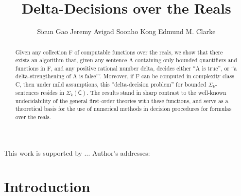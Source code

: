\documentclass[prodmode]{acmsmall} %
\title{Delta-Decisions over the Reals}
\author{Sicun Gao\affil{Carnegie Mellon University} Jeremy Avigad\affil{Carnegie Mellon University}  Soonho Kong\affil{Carnegie Mellon University} Edmund M. Clarke\affil{Carnegie Mellon University}}
\begin{document}
\begin{abstract}
Given any collection F of computable functions over the reals, we show that there exists an algorithm that, given any sentence A containing only bounded quantifiers and functions in F, and any positive rational number delta, decides either ``A is true'', or ``a delta-strengthening of A is false'''. Moreover, if F can be computed in complexity class C, then under mild assumptions, this ``delta-decision problem'' for bounded $\Sigma_k$-sentences resides in $\mathsf{\Sigma_k(C)}$. The results stand in sharp contrast to the well-known undecidability of the general first-order theories with these functions, and serve as a theoretical basis for the use of numerical methods in decision procedures for formulas over the reals. 
\end{abstract}


\acmformat{}

\begin{bottomstuff}
This work is supported by ...
Author's addresses: 
\end{bottomstuff}

\maketitle
\section{Introduction}
\end{document}
